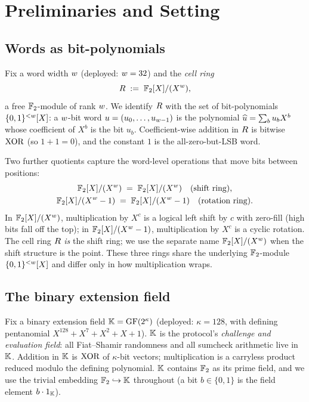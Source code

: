 \section{Preliminaries and Setting}
\label{sec:prelim}

\subsection{Words as bit-polynomials}

Fix a word width $w$ (deployed: $w = 32$) and the \emph{cell ring}
\[
  R \;:=\; \mathbb{F}_2[X]/(X^{w}),
\]
a free $\mathbb{F}_2$-module of rank $w$. We identify $R$ with the
set of bit-polynomials $\{0,1\}^{<w}[X]$: a $w$-bit word
$u = (u_0,\dots,u_{w-1})$ is the polynomial $\widehat{u} = \sum_b u_b X^b$
whose coefficient of $X^b$ is the bit $u_b$. Coefficient-wise addition in
$R$ is bitwise $\operatorname{XOR}$ (so $1+1=0$), and the constant $1$ is the
all-zero-but-LSB word.

Two further quotients capture the word-level operations that move bits
between positions:
\[
\begin{gathered}
  \mathbb{F}_2[X]/(X^{w}) \;=\; \mathbb{F}_2[X]/(X^{w})
  \quad\text{(shift ring),}\\
  \mathbb{F}_2[X]/(X^{w}-1) \;=\; \mathbb{F}_2[X]/(X^{w}-1)
  \quad\text{(rotation ring).}
\end{gathered}
\]
In $\mathbb{F}_2[X]/(X^{w})$, multiplication by $X^c$ is a logical left shift by $c$ with
zero-fill (high bits fall off the top); in $\mathbb{F}_2[X]/(X^{w}-1)$, multiplication by
$X^c$ is a cyclic rotation. The cell ring $R$ \emph{is} the shift
ring; we use the separate name $\mathbb{F}_2[X]/(X^{w})$ when the shift structure is the
point. These three rings share the underlying $\mathbb{F}_2$-module
$\{0,1\}^{<w}[X]$ and differ only in how multiplication wraps.

\subsection{The binary extension field}

Fix a binary extension field $\mathbb{K} = \mathrm{GF}(2^{\kappa})$ (deployed:
$\kappa = 128$, with defining pentanomial $X^{128}+X^7+X^2+X+1$). $\mathbb{K}$ is
the protocol's \emph{challenge and evaluation field}: all Fiat--Shamir
randomness and all sumcheck arithmetic live in $\mathbb{K}$. Addition in $\mathbb{K}$ is
$\operatorname{XOR}$ of $\kappa$-bit vectors; multiplication is a carryless product
reduced modulo the defining polynomial. $\mathbb{K}$ contains $\mathbb{F}_2$ as its
prime field, and we use the trivial embedding $\mathbb{F}_2 \hookrightarrow \mathbb{K}$
throughout (a bit $b\in\{0,1\}$ is the field element $b\cdot 1_{\mathbb{K}}$).

